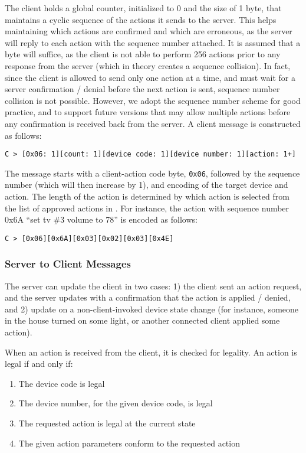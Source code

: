 The client holds a global counter, initialized to 0 and the size of 1 byte, that maintains a cyclic sequence of the actions it sends to the server. This helps maintaining which actions are confirmed and which are erroneous, as the server will reply to each action with the sequence number attached. It is assumed that a byte will suffice, as the client is not able to perform 256 actions prior to any response from the server (which in theory creates a sequence collision). In fact, since the client is allowed to send only one action at a time, and must wait for a server confirmation / denial before the next action is sent, sequence number collision is not possible. However, we adopt the sequence number scheme for good practice, and to support future versions that may allow multiple actions before any confirmation is received back from the server. A client message is constructed as follows:

\begin{verbatim}
C > [0x06: 1][count: 1][device code: 1][device number: 1][action: 1+]
\end{verbatim}

\noindent
The message starts with a client-action code byte, {\tt 0x06}, followed by the sequence number (which will then increase by 1), and encoding of the target device and action. The length of the action is determined by which action is selected from the list of approved actions in . For instance, the action with sequence number 0x6A ``set tv \#3 volume to 78'' is encoded as follows:

\begin{verbatim}
C > [0x06][0x6A][0x03][0x02][0x03][0x4E]
\end{verbatim}


\subsubsection{Server to Client Messages}
\label{sec:pdus:pdu:s_to_c}

The server can update the client in two cases: 1) the client sent an action request, and the server updates with a confirmation that the action is applied / denied, and 2) update on a non-client-invoked device state change (for instance, someone in the house turned on some light, or another connected client applied some action).

When an action is received from the client, it is checked for legality. An action is legal if and only if:
\begin{enumerate}
\item The device code is legal
\item The device number, for the given device code, is legal
\item The requested action is legal at the current state
\item The given action parameters conform to the requested action
\end{enumerate}

